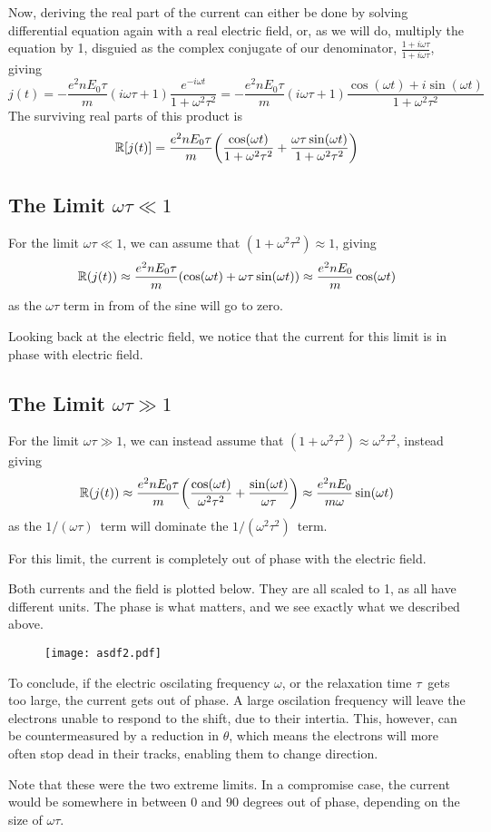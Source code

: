 \documentclass[12p,a4paper]{article}
\renewcommand{\exp}{e^}
\newcommand{\m}{\mathbb}
\renewcommand{\exp}{e^}
\begin{document}
Now, deriving the real part of the current can either be done by solving differential equation again with a real electric field, or, as we will do, multiply the equation by 1, disguied as the complex conjugate of our denominator, $\frac{1 + i\omega\tau}{1 + i\omega\tau}$, giving
\[
    j(t) = -\frac{e^2nE_0\tau}{m}(i\omega\tau + 1 )\frac{\exp{-i\omega t}}{1+\omega^2\tau^2} = -\frac{e^2nE_0\tau}{m}(i\omega\tau + 1 ) \frac{\cos(\omega t) + i\sin(\omega t)}{1 + \omega^2\tau^2}
\]
The surviving real parts of this product is
\[
    \m R[j(t)] = \frac{e^2nE_0\tau}{m}\qty(\frac{\cos(\omega t)}{1 + \omega^2\tau^2} + \frac{\omega\tau \sin(\omega t)}{1+\omega^2\tau^2})
\]

\subsection*{The Limit $\omega\tau \ll 1$}
For the limit $\omega\tau \ll 1$, we can assume that $(1 + \omega^2\tau^2) \approx 1$, giving
\[
    \m R(j(t)) \approx \frac{e^2nE_0\tau}{m}\qty(\cos(\omega t) + \omega\tau\sin(\omega t)) \approx \frac{e^2nE_0}{m}\cos(\omega t)
\]
as the $\omega\tau$ term in from of the sine will go to zero.

Looking back at the electric field, we notice that the current for this limit is in phase with electric field.

\subsection*{The Limit $\omega\tau \gg 1$}

For the limit $\omega\tau \gg 1$, we can instead assume that $(1 + \omega^2\tau^2) \approx \omega^2\tau^2$, instead giving
\[
    \m R(j(t)) \approx \frac{e^2nE_0\tau}{m}\qty(\frac{\cos(\omega t)}{\omega^2\tau^2} + \frac{\sin(\omega t)}{\omega \tau}) \approx \frac{e^2nE_0}{m\omega}\sin(\omega t)
\]
as the $1/(\omega\tau)$ term will dominate the $1/(\omega^2\tau^2)$ term.

For this limit, the current is completely out of phase with the electric field.

Both currents and the field is plotted below. They are all scaled to 1, as all have different units. The phase is what matters, and we see exactly what we described above.
\begin{figure}[H]
    \centering
    \texttt{[image: asdf2.pdf]}
\end{figure}


To conclude, if the electric oscilating frequency $\omega$, or the relaxation time $\tau$ gets too large, the current gets out of phase. A large oscilation frequency will leave the electrons unable to respond to the shift, due to their intertia. This, however, can be countermeasured by a reduction in $\theta$, which means the electrons will more often stop dead in their tracks, enabling them to change direction.

Note that these were the two extreme limits. In a compromise case, the current would be somewhere in between 0 and 90 degrees out of phase, depending on the size of $\omega\tau$.
\end{document}

